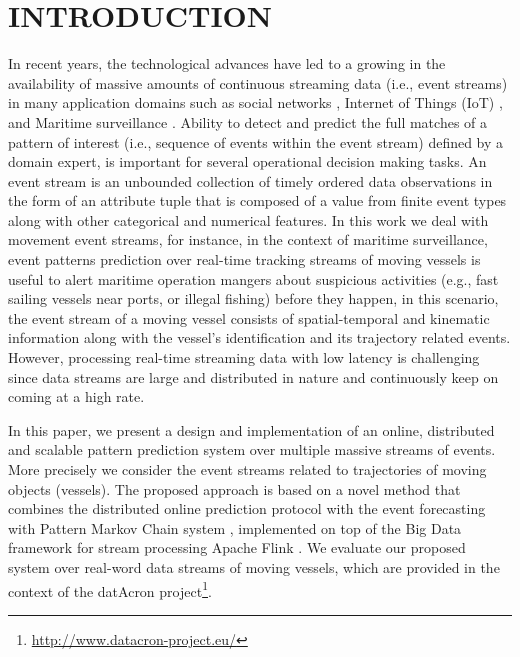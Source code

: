 \section{INTRODUCTION}


In recent years, the technological advances have led to a growing in the availability of massive amounts of continuous streaming data (i.e., event streams) in many application domains such as social networks \cite{mathioudakis2010twittermonitor}, Internet of Things (IoT) \cite{miorandi2012internet}, and Maritime surveillance \cite{patroumpas2015event}. Ability to detect and predict the full matches of a pattern of interest (i.e., sequence of events within the event stream) defined by a domain expert, is important for several operational decision making tasks.
An event stream is an unbounded collection of timely ordered data observations in the form of an attribute tuple that is composed of a value from finite event types along with other categorical and numerical features. In this work we deal with movement event streams, for instance, in the context of maritime surveillance, event patterns prediction over real-time tracking streams of moving vessels is useful to alert maritime operation mangers about suspicious activities (e.g., fast sailing vessels near ports, or illegal fishing) before they happen, in this scenario, the event stream of a moving vessel consists of spatial-temporal and kinematic information along with the vessel's identification and its trajectory related events. However, processing real-time streaming data with low latency is challenging since data streams are large and distributed in nature and continuously keep on coming at a high rate. 
\par In this paper, we present a design and implementation of an online, distributed and scalable pattern prediction system over multiple massive streams of events. More precisely we consider the event streams related to trajectories of moving objects (vessels). The proposed approach is based on a novel method that combines the distributed online prediction protocol \cite{dekel2012optimal,kamp2014communication} with the event forecasting with Pattern Markov Chain system \cite{alevizos2017event}, implemented on top of the Big Data framework for stream processing Apache Flink \cite{Flink}. We evaluate our proposed system over  real-word data streams of moving vessels, which are provided in the context of the datAcron project\footnote{\url{http://www.datacron-project.eu/}}.